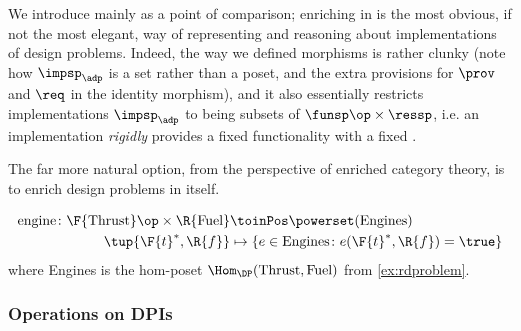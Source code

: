 We introduce \DPI mainly as a point of comparison; enriching in \Set is the most obvious, if not the most elegant, way of representing and reasoning about implementations of design problems. Indeed, the way we defined morphisms is rather clunky (note how $\impsp_\adp$ is a set rather than a poset, and the extra provisions for $\prov$ and $\req$ in the identity morphism), and it also essentially restricts implementations $\impsp_\adp$ to being subsets of $\funsp\op \times \ressp$, i.e. an implementation \emph{rigidly} provides a fixed functionality \fun with a fixed \res.

The far more natural option, from the perspective of enriched category theory, is to enrich design problems in \DP itself.

\begin{example}
  \begin{equation}
    \begin{aligned}
      \text{engine} \colon \F{\text{Thrust}}\op \times \R{\text{Fuel}} &\toinPos \powerset(\text{Engines}) \\
      \tup{\F{t}^*,\R{f}} &\mapsto \{ e \in \text{Engines} \colon e(\F{t}^*, \R{f}) = \true \}
    \end{aligned}
  \end{equation}
  where Engines is the hom-poset $\Hom_\DP(\text{Thrust}, \text{Fuel})$ from \cref{ex:rdproblem}.
\end{example}

\subsubsection{Operations on DPIs}




